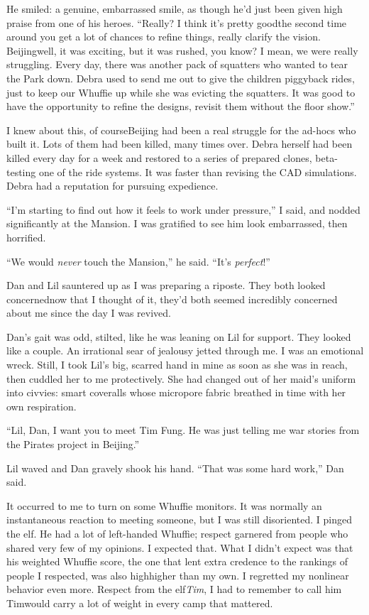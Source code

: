He smiled: a genuine, embarrassed smile, as though he'd just been
given high praise from one of his heroes. “Really? I think it's
pretty good{\dash}the second time around you get a lot of chances to
refine things, really clarify the vision. Beijing{\dash}well, it was
exciting, but it was rushed, you know? I mean, we were really
struggling. Every day, there was another pack of squatters who
wanted to tear the Park down. Debra used to send me out to give the
children piggyback rides, just to keep our Whuffie up while she was
evicting the squatters. It was good to have the opportunity to
refine the designs, revisit them without the floor show.”

I knew about this, of course{\dash}Beijing had been a real struggle for
the ad-hocs who built it. Lots of them had been killed, many times
over. Debra herself had been killed every day for a week and
restored to a series of prepared clones, beta-testing one of the
ride systems. It was faster than revising the CAD simulations.
Debra had a reputation for pursuing expedience.

“I'm starting to find out how it feels to work under pressure,” I
said, and nodded significantly at the Mansion. I was gratified to
see him look embarrassed, then horrified.

“We would \emph{never} touch the Mansion,” he said. “It's
\emph{perfect}!”

Dan and Lil sauntered up as I was preparing a riposte. They both
looked concerned{\dash}now that I thought of it, they'd both seemed
incredibly concerned about me since the day I was revived.

Dan's gait was odd, stilted, like he was leaning on Lil for
support. They looked like a couple. An irrational sear of jealousy
jetted through me. I was an emotional wreck. Still, I took Lil's
big, scarred hand in mine as soon as she was in reach, then cuddled
her to me protectively. She had changed out of her maid's uniform
into civvies: smart coveralls whose micropore fabric breathed in
time with her own respiration.

“Lil, Dan, I want you to meet Tim Fung. He was just telling me war
stories from the Pirates project in Beijing.”

Lil waved and Dan gravely shook his hand. “That was some hard
work,” Dan said.

It occurred to me to turn on some Whuffie monitors. It was normally
an instantaneous reaction to meeting someone, but I was still
disoriented. I pinged the elf. He had a lot of left-handed Whuffie;
respect garnered from people who shared very few of my opinions. I
expected that. What I didn't expect was that his weighted Whuffie
score, the one that lent extra credence to the rankings of people I
respected, was also high{\dash}higher than my own. I regretted my
nonlinear behavior even more. Respect from the elf{\dash}\emph{Tim}, I
had to remember to call him Tim{\dash}would carry a lot of weight in
every camp that mattered.

